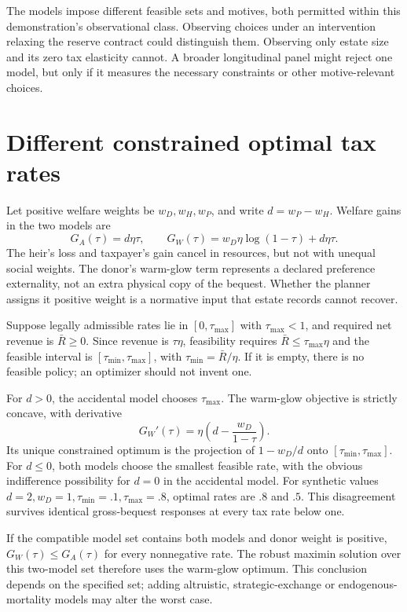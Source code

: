 \documentclass[11pt]{article}
\begin{document}
The models impose different feasible sets and motives, both permitted within this demonstration's observational class. Observing choices under an intervention relaxing the reserve contract could distinguish them. Observing only estate size and its zero tax elasticity cannot. A broader longitudinal panel might reject one model, but only if it measures the necessary constraints or other motive-relevant choices.

\section*{Different constrained optimal tax rates}
Let positive welfare weights be $w_D,w_H,w_P$, and write $d=w_P-w_H$. Welfare gains in the two models are
\[
 G_A(\tau)=d\eta\tau,
 \qquad
 G_W(\tau)=w_D\eta\log(1-\tau)+d\eta\tau.            \tag{2}
\]
The heir's loss and taxpayer's gain cancel in resources, but not with unequal social weights. The donor's warm-glow term represents a declared preference externality, not an extra physical copy of the bequest. Whether the planner assigns it positive weight is a normative input that estate records cannot recover.

Suppose legally admissible rates lie in $[0,\tau_{\max}]$ with $\tau_{\max}<1$, and required net revenue is $\bar R\geq0$. Since revenue is $\tau\eta$, feasibility requires $\bar R\leq\tau_{\max}\eta$ and the feasible interval is $[\tau_{\min},\tau_{\max}]$, with $\tau_{\min}=\bar R/\eta$. If it is empty, there is no feasible policy; an optimizer should not invent one.

For $d>0$, the accidental model chooses $\tau_{\max}$. The warm-glow objective is strictly concave, with derivative
\[
 G_W'(\tau)=\eta\left(d-\frac{w_D}{1-\tau}\right).
\]
Its unique constrained optimum is the projection of $1-w_D/d$ onto $[\tau_{\min},\tau_{\max}]$. For $d\leq0$, both models choose the smallest feasible rate, with the obvious indifference possibility for $d=0$ in the accidental model. For synthetic values $d=2,w_D=1,\tau_{\min}=.1,\tau_{\max}=.8$, optimal rates are $.8$ and $.5$. This disagreement survives identical gross-bequest responses at every tax rate below one.

If the compatible model set contains both models and donor weight is positive, $G_W(\tau)\leq G_A(\tau)$ for every nonnegative rate. The robust maximin solution over this two-model set therefore uses the warm-glow optimum. This conclusion depends on the specified set; adding altruistic, strategic-exchange or endogenous-mortality models may alter the worst case.
\end{document}
